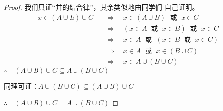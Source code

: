 \begin{proof}
    我们只证“并的结合律”，其余类似地由同学们
    自己证明。
\[\begin{split}
     x\in (A\cup B)\cup C &\quad \Rightarrow \quad x\in (A\cup B)\; \text{ 或 }\;  x\in C\\
     &\quad \Rightarrow \quad  (x\in A \; \text{ 或 }\;  x\in B)\; \text{ 或 }\;  x\in C  \\
     &\quad \Rightarrow \quad   x\in A\; \text{ 或 }\;  (x\in B\; \text{ 或 }\;  x\in C) \\
     &\quad \Rightarrow \quad  x\in A\; \text{ 或 }\;  x\in (B\cup C) \\
     &\quad \Rightarrow \quad  x\in A\cup (B\cup C)  
\end{split}\]
$\therefore\quad (A\cup B)\cup C\subseteq A\cup (B\cup C)$

同理可证：$A\cup (B\cup C)\subseteq (A\cup B)\cup C$

$\therefore\quad (A\cup B)\cup C=A\cup (B\cup C)$
\end{proof}



















\begin{example}
    
\end{example}
\begin{solution}
    
\end{solution}


\begin{example}
    
\end{example}

\begin{solution}
    
\end{solution}

\begin{example}
    
\end{example}
\begin{solution}
    
\end{solution}


